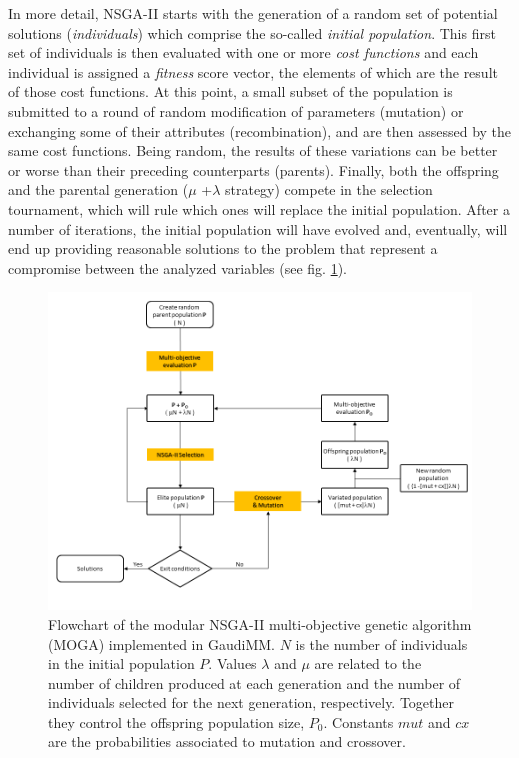 In more detail, NSGA-II starts with the generation of a random set of potential solutions (\textit{individuals}) which comprise the so-called \textit{initial population}. This first set of individuals is then evaluated with one or more \textit{cost functions} and each individual is assigned a \textit{fitness }score vector, the elements of which are the result of those cost functions. At this point, a small subset of the population is submitted to a round of random modification of parameters (mutation) or exchanging some of their attributes (recombination), and are then assessed by the same cost functions. Being random, the results of these variations can be better or worse than their preceding counterparts (parents). Finally, both the offspring and the parental generation ($ \mu $ +$ \lambda $  strategy) compete in the selection tournament, which will rule which ones will replace the initial population. After a number of iterations, the initial population will have evolved and, eventually, will end up providing reasonable solutions to the problem that represent a compromise between the analyzed variables (see fig. \ref{fig:nsga}).




\begin{figure} %
	\vspace*{-1cm}
	\includegraphics[width=0.9\textheight,angle=90]{./figures/04/nsga.png}
	\cprotect\caption[NSGA-II algorithm]{Flowchart of the modular NSGA-II multi-objective genetic algorithm (MOGA) implemented in GaudiMM. $ N $ is the number of individuals in the initial population $P$. Values $\lambda$ and $\mu$ are related to the number of children produced at each generation and the number of individuals selected for the next generation, respectively. Together they control the offspring population size, $ P_{0} $. Constants $ mut $ and $ cx $ are the probabilities associated to mutation and crossover.}
	\label{fig:nsga}
\end{figure}


